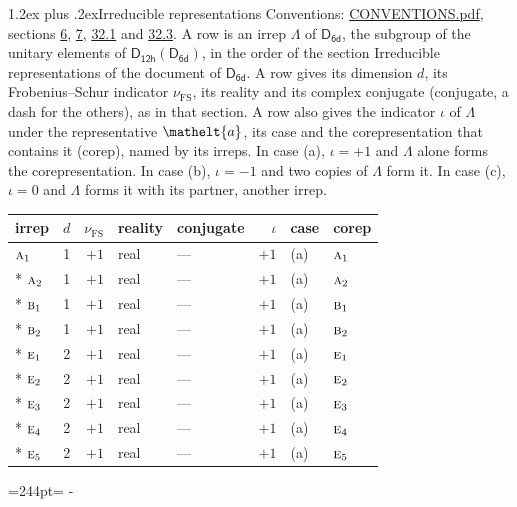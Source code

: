 \documentclass[10pt,a4paper]{article}
\makeatletter
\renewcommand\section{\@startsection{section}{1}{\z@}{-3ex plus -1ex minus -.2ex}%
  {1.2ex plus .2ex}{\normalfont\large\sffamily\bfseries\color{parttitle}}}
\newcommand{\needspace}[1]{\par\penalty-100\begingroup\dimen0=#1\relax\dimen2=\pagegoal
  \advance\dimen2-\pagetotal\ifdim\dimen0>\dimen2\relax\ifdim\dimen2>0pt\vfil\break\fi\fi
  \endgroup}
\numberwithin{equation}{section}
\newcommand{\eltfont}[1]{{\let\sigma\eltsigma\mathelt{#1}}}
\newcommand{\grp}[1]{\mathsf{#1}}
\newcommand{\irr}[1]{\text{\normalfont\scshape #1}}
\newcommand{\elt}[1]{\eltfont{#1}}
\newcommand{\fsind}{\nu_{\mathrm{FS}}}
\makeatother
\begin{document}
\section{Irreducible representations}\label{s:irreps}
Conventions: \href{../../CONVENTIONS.pdf}{CONVENTIONS.pdf}, sections \href{../../../rotation/CONVENTIONS.pdf\#conv.6}{6}, \href{../../../rotation/CONVENTIONS.pdf\#conv.7}{7}, \href{../../CONVENTIONS.pdf\#conv.32.1}{32.1} and \href{../../CONVENTIONS.pdf\#conv.32.3}{32.3}.
\leavevmode\label{n:irrep.Delta}A row is an irrep $\Lambda$ of $\grp{D_{6d}}$, the subgroup of the unitary elements of $\grp{D_{12h}}(\grp{D_{6d}})$, in the order of the section Irreducible representations of the document of \href{../../../rotation/data/pdf/D6d.pdf}{$\grp{D_{6d}}$}. \label{n:index.dimension}\label{n:index.frobenius}\label{n:head.irrep}\label{n:head.reality}\label{n:head.conjugate}A row gives its dimension $d$, its Frobenius--Schur indicator $\fsind$, its reality and its complex conjugate (conjugate, a dash for the others), as in that section. \label{n:head.case.corep}\label{n:head.corep}A row also gives the indicator $\iota$ of $\Lambda$ under the representative $\elt{a}$, its case and the corepresentation that contains it (corep), named by its irreps. In case (a), $\iota = +1$ and $\Lambda$ alone forms the corepresentation. In case (b), $\iota = -1$ and two copies of $\Lambda$ form it. In case (c), $\iota = 0$ and $\Lambda$ forms it with its partner, another irrep.
\setlength{\emergencystretch}{2em}\par\setlength{\emergencystretch}{0pt}
{\small\renewcommand{\arraystretch}{1.25}\setlength{\tabcolsep}{4pt}\begin{longtable}{@{}lrrllrll@{}}\toprule
irrep & $d$ & $\fsind$ & reality & conjugate & $\iota$ & case & corep\\\midrule\endhead
\bottomrule\endfoot\endlastfoot
$\irr{a}_{1}$ & 1 & $+1$ & real & --- & $+1$ & (a) & $\irr{a}_{1}$\\*
$\irr{a}_{2}$ & 1 & $+1$ & real & --- & $+1$ & (a) & $\irr{a}_{2}$\\*
$\irr{b}_{1}$ & 1 & $+1$ & real & --- & $+1$ & (a) & $\irr{b}_{1}$\\*
$\irr{b}_{2}$ & 1 & $+1$ & real & --- & $+1$ & (a) & $\irr{b}_{2}$\\*
$\irr{e}_{1}$ & 2 & $+1$ & real & --- & $+1$ & (a) & $\irr{e}_{1}$\\*
$\irr{e}_{2}$ & 2 & $+1$ & real & --- & $+1$ & (a) & $\irr{e}_{2}$\\*
$\irr{e}_{3}$ & 2 & $+1$ & real & --- & $+1$ & (a) & $\irr{e}_{3}$\\*
$\irr{e}_{4}$ & 2 & $+1$ & real & --- & $+1$ & (a) & $\irr{e}_{4}$\\*
$\irr{e}_{5}$ & 2 & $+1$ & real & --- & $+1$ & (a) & $\irr{e}_{5}$\\
\bottomrule\end{longtable}}
\needspace{244pt}
\end{document}
